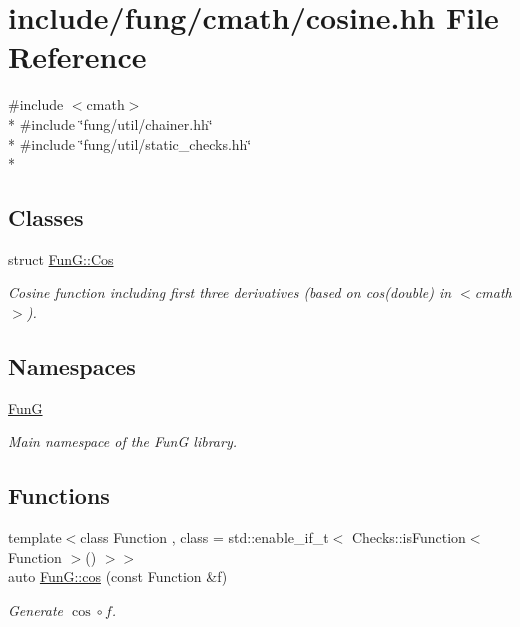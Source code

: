 \hypertarget{cosine_8hh}{}\section{include/fung/cmath/cosine.hh File Reference}
\label{cosine_8hh}
{\ttfamily \#include $<$cmath$>$}\\*
{\ttfamily \#include \char`\"{}fung/util/chainer.\+hh\char`\"{}}\\*
{\ttfamily \#include \char`\"{}fung/util/static\+\_\+checks.\+hh\char`\"{}}\\*
\subsection*{Classes}
\begin{DoxyCompactItemize}
\item 
struct \hyperlink{structFunG_1_1Cos}{Fun\+G\+::\+Cos}
\begin{DoxyCompactList}\small\item\em Cosine function including first three derivatives (based on cos(double) in $<$cmath$>$). \end{DoxyCompactList}\end{DoxyCompactItemize}
\subsection*{Namespaces}
\begin{DoxyCompactItemize}
\item 
 \hyperlink{namespaceFunG}{FunG}
\begin{DoxyCompactList}\small\item\em Main namespace of the FunG library. \end{DoxyCompactList}\end{DoxyCompactItemize}
\subsection*{Functions}
\begin{DoxyCompactItemize}
\item 
{\footnotesize template$<$class Function , class  = std\+::enable\+\_\+if\+\_\+t$<$ Checks\+::is\+Function$<$ Function $>$() $>$$>$ }\\auto \hyperlink{group__CMathGroup_ga7e9b2ac717cd2350663293cb66ba6cbd}{Fun\+G\+::cos} (const Function \&f)
\begin{DoxyCompactList}\small\item\em Generate $ \cos\circ f $. \end{DoxyCompactList}\end{DoxyCompactItemize}
